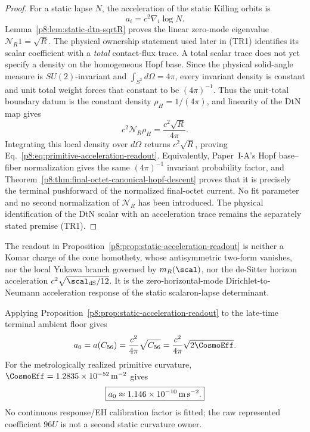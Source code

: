 \documentclass[12pt,a4paper]{article}
\begin{document}
\begin{proof}
For a static lapse $N$, the acceleration of the static Killing orbits is
\begin{equation}
\label{p8:eq:lapse-gradient-acceleration}
 a_i=c^2\nabla_i\log N .
\end{equation}
Lemma~\ref{p8:lem:static-dtn-sqrtR} proves the linear zero-mode eigenvalue
\(\mathcal N_R1=\sqrt R\).  The physical ownership statement used later in
(TR1) identifies its scalar coefficient with a \emph{total} contact-flux
trace.  A total scalar trace does not yet specify a density on the homogeneous
Hopf base.  Since the physical solid-angle measure is \(SU(2)\)-invariant and
\(\int_{S^2}d\Omega=4\pi\), every invariant density is constant and unit total
weight forces that constant to be \((4\pi)^{-1}\).  Thus the unit-total
boundary datum is the constant density \(\rho_H=1/(4\pi)\), and linearity of
the DtN map gives
\[
 c^2\mathcal N_R\rho_H
 =\frac{c^2\sqrt R}{4\pi}.
\]
Integrating this local density over \(d\Omega\) returns
\(c^2\sqrt R\), proving Eq.~\eqref{p8:eq:primitive-acceleration-readout}.
Equivalently, Paper~I-A's Hopf base--fiber normalization gives the same
\((4\pi)^{-1}\) invariant probability factor, and
Theorem~\ref{p8:thm:final-octet-canonical-hopf-descent} proves that it is
precisely the terminal pushforward of the normalized final-octet current.  No
fit parameter and no second normalization of \(\mathcal N_R\) has been
introduced.  The physical identification of the DtN scalar with an
acceleration trace remains the separately stated premise (TR1).
\end{proof}

\begin{remark}
\label{p8:rem:static-readout-not-yukawa}
The readout in Proposition~\ref{p8:prop:static-acceleration-readout} is neither a Komar charge of the cone homothety, whose antisymmetric two-form vanishes, nor the local Yukawa branch governed by $m_R(\scal)$, nor the de-Sitter horizon acceleration $c^2\sqrt{\scal_{\rm dS}/12}$.  It is the zero-horizontal-mode Dirichlet-to-Neumann acceleration response of the static scalaron-lapse determinant.
\end{remark}

Applying Proposition~\ref{p8:prop:static-acceleration-readout} to the late-time terminal ambient floor gives
\[
 a_0=a(C_{56})=\frac{c^2}{4\pi}\sqrt{C_{56}}
 =\frac{c^2}{4\pi}\sqrt{2\CosmoEff}.
\]
For the metrologically realized primitive curvature,
\(\CosmoEff=1.2835\times10^{-52}\,{\rm m}^{-2}\) gives
\[
 \boxed{a_0\approx1.146\times10^{-10}\,{\rm m\,s}^{-2}.}
\]
No continuous response/EH calibration factor is fitted; the raw represented coefficient \(96U\) is not a second static curvature owner.
\end{document}
